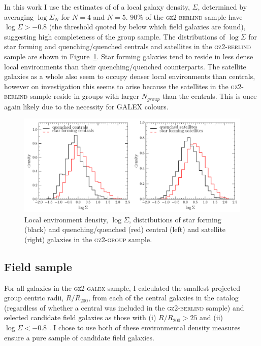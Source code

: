 In this work I use the estimates of \cite{Bamford09} of a local galaxy density, $\Sigma$, determined by averaging $\log\Sigma_N$ for $N = 4$ and $N=5$. $90\%$ of the \textsc{gz2-berlind} sample have $\log\Sigma > -0.8$ (the threshold quoted by \citealt{Baldry06} below which field galaxies are found), suggesting high completeness of the group sample. The distributions of $\log\Sigma$ for star forming and quenching/quenched centrals and satellites in the \textsc{gz2-berlind} sample are shown in Figure~\ref{fig:sigmadist}. Star forming galaxies tend to reside in less dense local environments than their quenching/quenched counterparts. The satellite galaxies as a whole also seem to occupy denser local environments than centrals, however on investigation this seems to arise because the satellites in the \textsc{gz2-berlind} sample reside in groups with larger $N_{group}$ than the centrals. This is once again likely due to the necessity for GALEX colours. 

\begin{figure}
\centering
\includegraphics[width=\textwidth]{environment/SIGMA_density_sf_q_cent_sat.pdf}
\caption[Local environment density distributions of central and satellite galaxies]{Local environment density, $\log\Sigma$, distributions of star forming (black) and quenching/quenched (red) central (left) and satellite (right) galaxies in the \textsc{gz2-group} sample.}
\label{fig:sigmadist}
\end{figure}


\subsection{Field sample}\label{sec:field}

For all galaxies in the \textsc{gz2-galex} sample, I calculated the smallest projected group centric radii, $R/R_{200}$, from each of the central galaxies in the \citet{berlind06} catalog (regardless of whether a central was included in the \textsc{gz2-berlind} sample) and selected candidate field galaxies as those with (i) $R/R_{200} > 25$ and (ii) $\log\Sigma < -0.8$ \citep[the threshold on the local environment density which selects field galaxies as defined by][]{Baldry06}. I chose to use both of these environmental density measures ensure a pure sample of candidate field galaxies.

